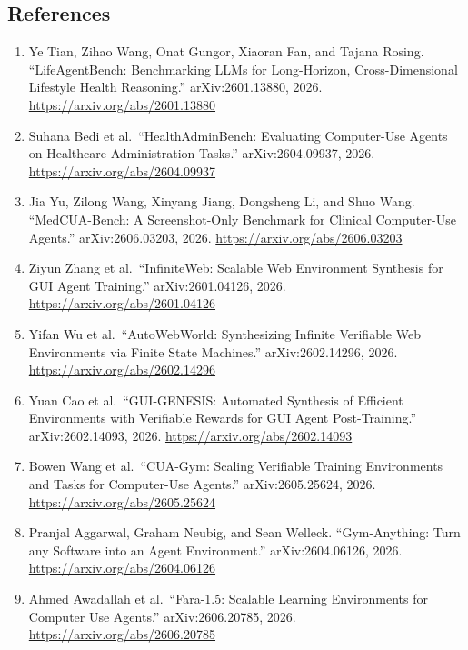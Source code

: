 \documentclass[
]{article}
\providecommand{\tightlist}{%
  \setlength{\itemsep}{0pt}\setlength{\parskip}{0pt}}
\begin{document}
\subsection{References}\label{references}

\begin{enumerate}
\def\labelenumi{\arabic{enumi}.}
\tightlist
\item
  Ye Tian, Zihao Wang, Onat Gungor, Xiaoran Fan, and Tajana Rosing.
  ``LifeAgentBench: Benchmarking LLMs for Long-Horizon,
  Cross-Dimensional Lifestyle Health Reasoning.'' arXiv:2601.13880,
  2026. \url{https://arxiv.org/abs/2601.13880}
\item
  Suhana Bedi et al.~``HealthAdminBench: Evaluating Computer-Use Agents
  on Healthcare Administration Tasks.'' arXiv:2604.09937, 2026.
  \url{https://arxiv.org/abs/2604.09937}
\item
  Jia Yu, Zilong Wang, Xinyang Jiang, Dongsheng Li, and Shuo Wang.
  ``MedCUA-Bench: A Screenshot-Only Benchmark for Clinical Computer-Use
  Agents.'' arXiv:2606.03203, 2026.
  \url{https://arxiv.org/abs/2606.03203}
\item
  Ziyun Zhang et al.~``InfiniteWeb: Scalable Web Environment Synthesis
  for GUI Agent Training.'' arXiv:2601.04126, 2026.
  \url{https://arxiv.org/abs/2601.04126}
\item
  Yifan Wu et al.~``AutoWebWorld: Synthesizing Infinite Verifiable Web
  Environments via Finite State Machines.'' arXiv:2602.14296, 2026.
  \url{https://arxiv.org/abs/2602.14296}
\item
  Yuan Cao et al.~``GUI-GENESIS: Automated Synthesis of Efficient
  Environments with Verifiable Rewards for GUI Agent Post-Training.''
  arXiv:2602.14093, 2026. \url{https://arxiv.org/abs/2602.14093}
\item
  Bowen Wang et al.~``CUA-Gym: Scaling Verifiable Training Environments
  and Tasks for Computer-Use Agents.'' arXiv:2605.25624, 2026.
  \url{https://arxiv.org/abs/2605.25624}
\item
  Pranjal Aggarwal, Graham Neubig, and Sean Welleck. ``Gym-Anything:
  Turn any Software into an Agent Environment.'' arXiv:2604.06126, 2026.
  \url{https://arxiv.org/abs/2604.06126}
\item
  Ahmed Awadallah et al.~``Fara-1.5: Scalable Learning Environments for
  Computer Use Agents.'' arXiv:2606.20785, 2026.
  \url{https://arxiv.org/abs/2606.20785}
\end{enumerate}


\end{document}
